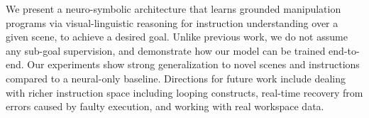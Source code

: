 We present a neuro-symbolic architecture that learns grounded manipulation programs via visual-linguistic reasoning for instruction understanding over a given scene, to achieve a desired goal. Unlike previous work, we do not assume any sub-goal supervision, and demonstrate how our model can be trained end-to-end. Our experiments show strong generalization to novel scenes and instructions compared to a neural-only baseline.
%
%
Directions for future work include dealing with richer instruction space including looping constructs, real-time recovery from errors caused by faulty execution, and working with real workspace data.